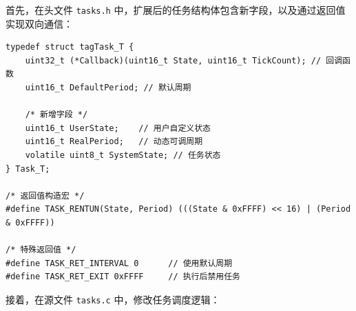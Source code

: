 首先，在头文件 \texttt{tasks.h} 中，扩展后的任务结构体包含新字段，以及通过返回值实现双向通信：

\begin{lstlisting}[style=c]
typedef struct tagTask_T {
    uint32_t (*Callback)(uint16_t State, uint16_t TickCount); // 回调函数
    uint16_t DefaultPeriod; // 默认周期

    /* 新增字段 */
    uint16_t UserState;    // 用户自定义状态
    uint16_t RealPeriod;   // 动态可调周期
    volatile uint8_t SystemState; // 任务状态
} Task_T;

/* 返回值构造宏 */
#define TASK_RENTUN(State, Period) (((State & 0xFFFF) << 16) | (Period & 0xFFFF))

/* 特殊返回值 */
#define TASK_RET_INTERVAL 0      // 使用默认周期
#define TASK_RET_EXIT 0xFFFF     // 执行后禁用任务
\end{lstlisting}

接着，在源文件 \texttt{tasks.c} 中，修改任务调度逻辑：

